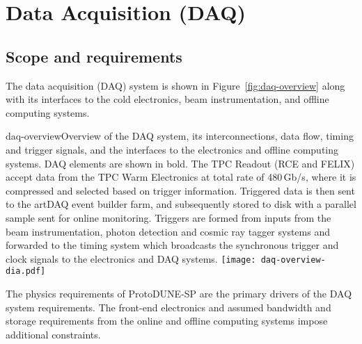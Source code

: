\section{Data Acquisition (DAQ)} 
\label{sec:daq}

\subsection{Scope and requirements}

The data acquisition (DAQ) system is shown in Figure~\ref{fig:daq-overview} along with its
interfaces to the cold electronics, beam instrumentation, and offline
computing systems.  

\begin{cdrfigure}{daq-overview}{Overview of the
DAQ system, its interconnections, data flow, timing and trigger signals,
and the interfaces to the electronics and offline computing systems.  DAQ elements are shown in bold. The TPC Readout (RCE and FELIX) accept
data from the TPC Warm Electronics at total rate of 480\,Gb/s, where it is compressed and 
selected based on trigger information.  Triggered data is then sent to the artDAQ event builder farm, and subsequently 
stored to disk with a parallel sample sent for online monitoring.  Triggers are formed from inputs 
from the beam instrumentation, photon detection and cosmic ray tagger systems and forwarded
to the timing system which broadcasts the synchronous trigger and clock signals to the electronics and DAQ systems.
}
        \texttt{[image: daq-overview-dia.pdf]}
\end{cdrfigure}

 
The physics requirements of  ProtoDUNE-SP are the primary drivers of the
DAQ system requirements.
The front-end electronics and assumed bandwidth and storage requirements
from the online and offline computing systems impose additional constraints.  


